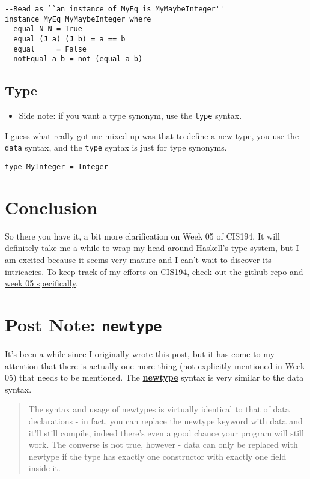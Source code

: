 \documentclass[12pt]{article}
\newcommand{\tightlist}{\setlength{\itemsep}{0pt}\setlength{\parskip}{0pt}}
\begin{document}
\begin{lstlisting} 
--Read as ``an instance of MyEq is MyMaybeInteger'' 
instance MyEq MyMaybeInteger where 
  equal N N = True
  equal (J a) (J b) = a == b 
  equal _ _ = False 
  notEqual a b = not (equal a b) 
\end{lstlisting}

\subsection{Type}

\begin{itemize}
\tightlist
\item
  Side note: if you want a type synonym, use the \texttt{type} syntax.
\end{itemize}

I guess what really got me mixed up was that to define a new type, you
use the \texttt{data} syntax, and the \texttt{type} syntax is just for
type synonyms.

\begin{lstlisting} 
type MyInteger = Integer 
\end{lstlisting}

\section{Conclusion}\label{conclusion}

So there you have it, a bit more clarification on Week 05 of CIS194. It
will definitely take me a while to wrap my head around Haskell's type
system, but I am excited because it seems very mature and I can't wait
to discover its intricacies. To keep track of my efforts on CIS194,
check out the \href{https://github.com/2016rshah/CIS194}{github repo}
and \href{https://github.com/2016rshah/CIS194/tree/master/05}{week 05
specifically}.

\section{\texorpdfstring{Post Note:
\texttt{newtype}}{Post Note: newtype}}\label{post-note-newtype}

It's been a while since I originally wrote this post, but it has come to
my attention that there is actually one more thing (not explicitly
mentioned in Week 05) that needs to be mentioned. The
\href{https://wiki.haskell.org/Newtype}{\textbf{newtype}} syntax is very
similar to the data syntax.

\begin{quote}
The syntax and usage of newtypes is virtually identical to that of data
declarations - in fact, you can replace the newtype keyword with data
and it'll still compile, indeed there's even a good chance your program
will still work. The converse is not true, however - data can only be
replaced with newtype if the type has exactly one constructor with
exactly one field inside it.
\end{quote}
\end{document}
